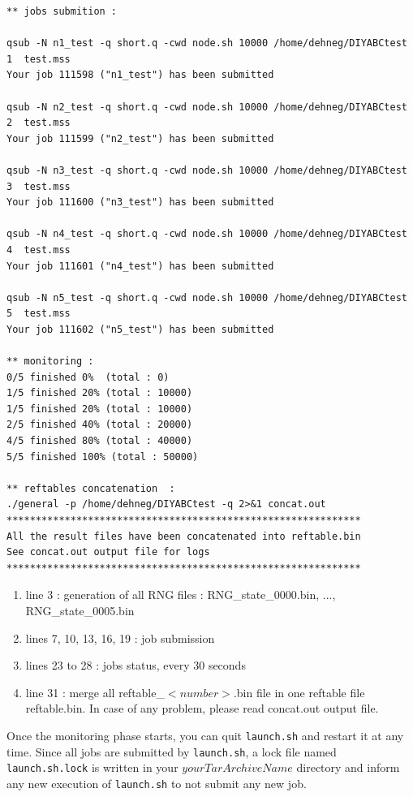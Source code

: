 \begin{minipage}{0.99\textwidth}
\begin{lstlisting}
** jobs submition :

qsub -N n1_test -q short.q -cwd node.sh 10000 /home/dehneg/DIYABCtest 1  test.mss
Your job 111598 ("n1_test") has been submitted

qsub -N n2_test -q short.q -cwd node.sh 10000 /home/dehneg/DIYABCtest 2  test.mss
Your job 111599 ("n2_test") has been submitted

qsub -N n3_test -q short.q -cwd node.sh 10000 /home/dehneg/DIYABCtest 3  test.mss
Your job 111600 ("n3_test") has been submitted

qsub -N n4_test -q short.q -cwd node.sh 10000 /home/dehneg/DIYABCtest 4  test.mss
Your job 111601 ("n4_test") has been submitted

qsub -N n5_test -q short.q -cwd node.sh 10000 /home/dehneg/DIYABCtest 5  test.mss
Your job 111602 ("n5_test") has been submitted

** monitoring :
0/5 finished 0%  (total : 0)
1/5 finished 20% (total : 10000)
1/5 finished 20% (total : 10000)
2/5 finished 40% (total : 20000)
4/5 finished 80% (total : 40000)
5/5 finished 100% (total : 50000)

** reftables concatenation  :
./general -p /home/dehneg/DIYABCtest -q 2>&1 concat.out
*************************************************************
All the result files have been concatenated into reftable.bin
See concat.out output file for logs
*************************************************************
\end{lstlisting}
   \end{minipage}
\begin{enumerate}
    \item line 3 : generation of all RNG files : \textsf{RNG\_state\_0000.bin}, ..., \textsf{RNG\_state\_0005.bin}
    \item lines 7, 10, 13, 16, 19 : job submission 
    \item lines 23 to 28 : jobs status, every 30 seconds
    \item line 31 : merge all \textsf{reftable\_$<number>$.bin} file in one reftable file \textsf{reftable.bin}. In case of any problem, please read \textsf{concat.out} output file.
\end{enumerate}
Once the monitoring phase starts, you can quit \texttt{launch.sh} and restart it at any time. Since all jobs are submitted by \texttt{launch.sh}, a lock file named \texttt{launch.sh.lock} is written in your $yourTarArchiveName$ directory and inform any new execution of \texttt{launch.sh} to not submit any new job.

